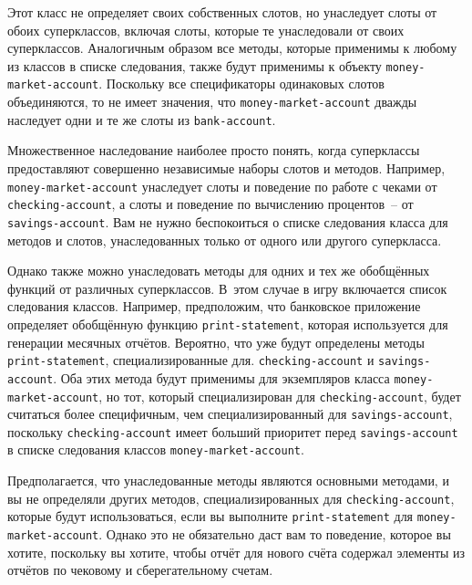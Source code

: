 Этот класс не определяет своих собственных слотов, но унаследует слоты от обоих
суперклассов, включая слоты, которые те унаследовали от своих суперклассов.  Аналогичным
образом все методы, которые применимы к любому из классов в списке следования, также
будут применимы к объекту \lstinline{money-market-account}.  Поскольку все спецификаторы
одинаковых слотов объединяются, то не имеет значения, что \lstinline{money-market-account}
дважды наследует одни и те же слоты из \lstinline{bank-account}.

Множественное наследование наиболее просто понять, когда суперклассы предоставляют
совершенно независимые наборы слотов и методов.  Например, \lstinline{money-market-account}
унаследует слоты и поведение по работе с чеками от \lstinline{checking-account}, а слоты и
поведение по вычислению процентов~-- от \lstinline{savings-account}.  Вам не нужно беспокоиться
о списке следования класса для методов и слотов, унаследованных только от одного или
другого суперкласса.

Однако также можно унаследовать методы для одних и тех же обобщённых функций от
различных суперклассов.  В~этом случае в игру включается список следования
классов.  Например, предположим, что банковское приложение определяет обобщённую функцию
\lstinline{print-statement}, которая используется для генерации месячных отчётов.  Вероятно,
что уже будут определены методы \lstinline{print-statement}, специализированные для.
\lstinline{checking-account} и \lstinline{savings-account}.  Оба этих метода будут применимы для
экземпляров класса \lstinline{money-market-account}, но тот, который специализирован для
\lstinline{checking-account}, будет считаться более специфичным, чем специализированный для
\lstinline{savings-account}, поскольку \lstinline{checking-account} имеет больший приоритет перед
\lstinline{savings-account} в списке следования классов \lstinline{money-market-account}.

Предполагается, что унаследованные методы являются основными методами, и вы не определяли
других методов, специализированных для \lstinline{checking-account}, которые будут
использоваться, если вы выполните \lstinline{print-statement} для \lstinline{money-market-account}.
Однако это не обязательно даст вам то поведение, которое вы хотите, поскольку вы хотите,
чтобы отчёт для нового счёта содержал элементы из отчётов по чековому и сберегательному
счетам.

